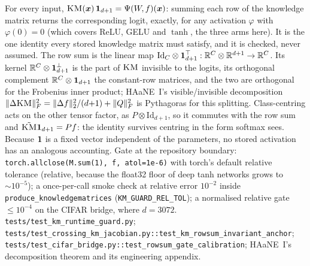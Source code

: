 {For every input, $\textsc{KM}(\boldsymbol{x})\,\boldsymbol{1}_{d+1}=\Psi(W\!,f)(\boldsymbol{x})$: summing each row of the knowledge matrix returns the corresponding logit, exactly, for any activation $\varphi$ with $\varphi(0)=0$ (which covers ReLU, GELU and $\tanh$, the three arms here). It is the one identity every stored knowledge matrix must satisfy, and it is checked, never assumed.}
{The row sum is the linear map $\mathrm{Id}_C\otimes\boldsymbol{1}_{d+1}^{\top}:\mathbb{R}^C\otimes\mathbb{R}^{d+1}\to\mathbb{R}^C$. Its kernel $\mathbb{R}^C\otimes\boldsymbol{1}_{d+1}^{\perp}$ is the part of $\textsc{KM}$ invisible to the logits, its orthogonal complement $\mathbb{R}^C\otimes\boldsymbol{1}_{d+1}$ the constant-row matrices, and the two are orthogonal for the Frobenius inner product; HAaNE~I's visible/invisible decomposition $\|\Delta\textsc{KM}\|_F^2=\|\Delta f\|_2^2/(d{+}1)+\|Q\|_F^2$ is Pythagoras for this splitting. Class-centring acts on the other tensor factor, as $P\otimes\mathrm{Id}_{d+1}$, so it commutes with the row sum and $\tilde{\textsc{KM}}\boldsymbol{1}_{d+1}=Pf$: the identity survives centring in the form softmax sees. Because $\boldsymbol{1}$ is a fixed vector independent of the parameters, no stored activation has an analogous accounting.}
{Gate at the repository boundary: \texttt{torch.allclose(M.sum(1), f, atol=1e-6)} with torch's default relative tolerance (relative, because the float32 floor of deep tanh networks grows to $\sim10^{-5}$); a once-per-call smoke check at relative error $10^{-2}$ inside \texttt{produce\_knowledgematrices} (\texttt{KM\_GUARD\_REL\_TOL}); a normalised relative gate $\le10^{-4}$ on the CIFAR bridge, where $d=3072$.}
{\texttt{tests/test\_km\_runtime\_guard.py}; \texttt{tests/test\_crossing\_km\_jacobian.py::test\_km\_rowsum\_invariant\_anchor}; \texttt{tests/test\_cifar\_bridge.py::test\_rowsum\_gate\_calibration}; HAaNE~I's decomposition theorem and its engineering appendix.}
